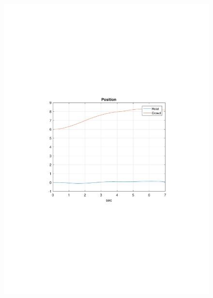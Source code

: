 \documentclass[table]{beamer}
\begin{document}
\begin{frame}[c]
\begin{columns}[c]
\begin{figure}
			\includegraphics[trim=4cm 9cm 4cm 9.5cm, clip=true, width=\linewidth]{img/Example3_Position}
			\vskip 0mm

\end{figure}
\end{columns}
\end{frame}
\end{document}
